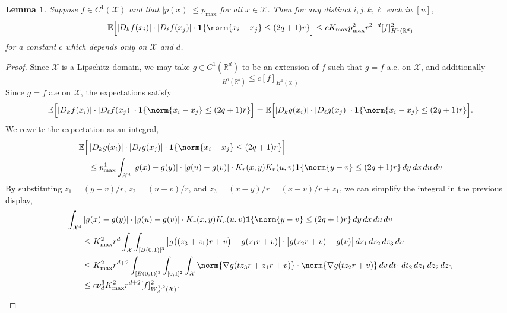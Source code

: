 \documentclass{article}
\newcommand{\Reals}{\mathbb{R}}
\newcommand{\abs}[1]{\left \lvert #1 \right \rvert}
\newcommand{\1}{\mathbf{1}}
\newcommand{\Rd}{\Reals^d}
\newcommand{\Xset}{\mathcal{X}}
\newcommand{\Ebb}{\mathbb{E}}
\theoremstyle{alden}
\theoremstyle{aldenthm}
\newtheorem{lemma}{Lemma}
\theoremstyle{definition}
\theoremstyle{remark}
\begin{document}
\begin{lemma}
	\label{lem:expected_first_order_seminorm_3}
	Suppose $f \in C^{1}(\Xset)$ and that $\abs{p(x)} \leq p_{\max}$ for all $x \in \Xset$. Then for any distinct $i,j,k,\ell$ each in $[n]$,
	\begin{equation*}
	\Ebb\Bigl[\abs{D_{k}f(x_i)}\cdot{\abs{D_{\ell}f(x_j)}}\cdot\1\{\norm{x_i - x_j} \leq (2q + 1)r\}\Bigr] \leq c K_{\max} p_{\max}^2 r^{2 + d} [f]_{H^1(\Rd)}^2
	\end{equation*}
	for a constant $c$ which depends only on $\Xset$ and $d$.
\end{lemma}
\begin{proof}
	Since $\Xset$ is a Lipschitz domain, we may take $g \in C^1(\Rd)$ to be an extension of $f$ such that $g = f$ a.e. on $\Xset$, and additionally
	\begin{equation*}
	[g]_{H^1(\Rd)} \leq c[f]_{H^1(\Xset)}
	\end{equation*}
	Since $g = f$ a.e on $\Xset$, the expectations satisfy
	\begin{equation*}
	\Ebb\Bigl[\abs{D_{k}f(x_i)}\cdot{\abs{D_{\ell}f(x_j)}}\cdot\1\{\norm{x_i - x_j} \leq (2q + 1)r\}\Bigr] = 	\Ebb\Bigl[\abs{D_{k}g(x_i)}\cdot{\abs{D_{\ell}g(x_j)}}\cdot\1\{\norm{x_i - x_j} \leq (2q + 1)r\}\Bigr].
	\end{equation*}
	We rewrite the expectation as an integral,
	\begin{align*}
	\Ebb\Bigl[& \abs{D_{k}g(x_i)}\cdot{\abs{D_{\ell}g(x_j)}}\cdot\1\{\norm{x_i - x_j} \leq (2q + 1)r\}\Bigr] \\
	& \leq p_{\max}^4 \int_{\Xset^4} \abs{g(x) - g(y)} \cdot \abs{g(u) - g(v)} \cdot  K_r(x,y) K_r(u,v) \1\{\norm{y - v} \leq (2q + 1)r\} \,dy \,dx \,du \,dv
	\end{align*}
	By substituting $z_1 = (y - v)/r$, $z_2 = (u - v)/r$, and $z_3 = (x - y)/r = (x - v)/r + z_1$, we can simplify the integral in the previous display,
	\begin{align*}
	\int_{\Xset^4} & \abs{g(x) - g(y)} \cdot \abs{g(u) - g(v)} \cdot K_r(x,y) K_r(u,v) \1\{\norm{y - v} \leq (2q + 1)r\} \,dy \,dx \,du \,dv \\
	& \leq K_{\max}^2 r^d \int_{\Xset} \int_{[B(0,1)]^3} \abs{g\bigl((z_3 + z_1)r + v\bigr) - g(z_1r + v)} \cdot \bigl|g(z_2r + v) - g(v)\bigr| \,dz_1 \,dz_2 \,dz_3 \,dv \\
	& \leq  K_{\max}^2 r^{d + 2} \int_{[B(0,1)]^3} \int_{[0,1]^2} \int_{\Xset} \norm{\nabla g(t z_3 r + z_1r + v)} \cdot \norm{\nabla g(t z_2 r + v)} \,dv \,dt_1 \,dt_2 \,dz_1 \,dz_2 \,dz_3 \\
	& \leq c \nu_d^3 K_{\max}^2 r^{d + 2} [f]_{W_{d}^{1,2}(\Xset)}^2.
	\end{align*}
\end{proof}
\end{document}
